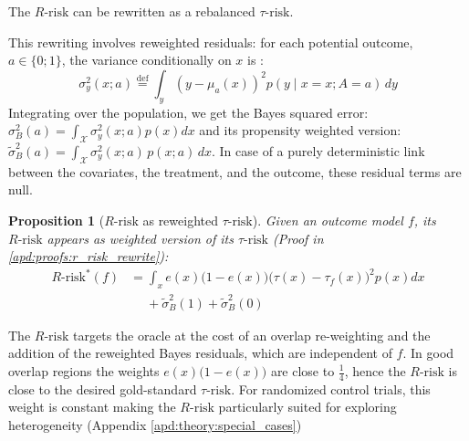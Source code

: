 \documentclass[a4paper,num-refs]{oup-contemporary}%
\newtheorem{proposition}[theorem]{Proposition}%
\begin{document}
The $R\text{-risk}$ can be rewritten as a rebalanced $\tau \text{-risk}$.


This rewriting involves reweighted residuals: for each potential outcome, $a \in
    \{0; 1\}$, the variance conditionally on $x$ is \cite{shalit_estimating_2017}:
\begin{equation*}\label{eq:residuals}
    \sigma_{y}^{2}(x ; a) \overset{\text{def}}{=}
    \int_{y}\left(y-\mu_{a}(x)\right)^{2} p(y \mid x=x ; A=a) \, d y
\end{equation*}
Integrating over the population, we get the Bayes squared error:
$\sigma^2_{B}(a) = \int_{\mathcal X} \sigma_y^2(x;a) p(x)dx$
and its propensity weighted version:
$\tilde{\sigma}^2_{B}(a) = \int_{\mathcal X}\sigma_y^2(x;a)\,  p(x;
    a)\,dx$. In case of a purely deterministic link between the
covariates, the treatment, and the outcome, these residual terms are null.



\begin{proposition}[$R \text{-risk}$ as reweighted
        $\tau\text{-risk}$]\label{theory:prop:r_risk_rewrite} Given an outcome model
    $f$, its $R\text{-risk}$ appears as weighted version of its $\tau\text{-risk}$
    (Proof in \ref{apd:proofs:r_risk_rewrite}):
    \begin{align}
        R\text{-risk}^*(f) & = \int_{x} e(x)\big(1-e(x)\big)\big(\tau(x)-\tau_ {f}(x)\big)^{2} p(x) d x \nonumber \\
                           & \quad\; + \tilde{\sigma}_B^2(1) + \tilde{\sigma}_B^{2}(0)
    \end{align}
\end{proposition}

The $R \text{-risk}$ targets the oracle at the cost of an overlap re-weighting
and the addition of the reweighted Bayes residuals, which are independent of
$f$. In good overlap regions the weights $e(x) \big(1-e(x) \big)$ are close to
$\frac{1}{4}$, hence the $R \text{-risk}$ is close to the desired gold-standard
$\tau \text{-risk}$. For randomized control trials, this weight is constant
making the $R\text{-risk}$ particularly suited for exploring
heterogeneity (Appendix \ref{apd:theory:special_cases})
\end{document}
